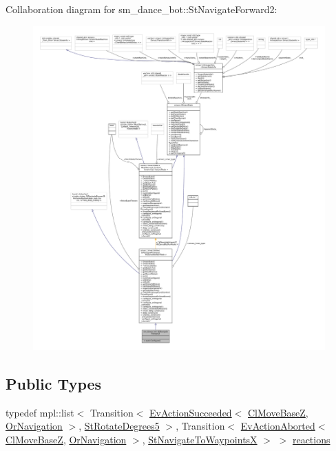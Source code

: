 Collaboration diagram for sm\+\_\+dance\+\_\+bot\+:\+:St\+Navigate\+Forward2\+:
\nopagebreak
\begin{figure}[H]
\begin{center}
\leavevmode
\includegraphics[width=350pt]{structsm__dance__bot_1_1StNavigateForward2__coll__graph}
\end{center}
\end{figure}
\subsection*{Public Types}
\begin{DoxyCompactItemize}
\item 
typedef mpl\+::list$<$ Transition$<$ \hyperlink{structsmacc_1_1default__events_1_1EvActionSucceeded}{Ev\+Action\+Succeeded}$<$ \hyperlink{classcl__move__base__z_1_1ClMoveBaseZ}{Cl\+Move\+BaseZ}, \hyperlink{classsm__dance__bot_1_1OrNavigation}{Or\+Navigation} $>$, \hyperlink{structsm__dance__bot_1_1StRotateDegrees5}{St\+Rotate\+Degrees5} $>$, Transition$<$ \hyperlink{structsmacc_1_1default__events_1_1EvActionAborted}{Ev\+Action\+Aborted}$<$ \hyperlink{classcl__move__base__z_1_1ClMoveBaseZ}{Cl\+Move\+BaseZ}, \hyperlink{classsm__dance__bot_1_1OrNavigation}{Or\+Navigation} $>$, \hyperlink{structsm__dance__bot_1_1StNavigateToWaypointsX}{St\+Navigate\+To\+WaypointsX} $>$ $>$ \hyperlink{structsm__dance__bot_1_1StNavigateForward2_ac9a6d0e0aa772d68bcb6d7932a21463a}{reactions}
\end{DoxyCompactItemize}
